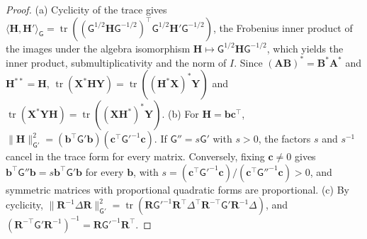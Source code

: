 \begin{proof}
(a) Cyclicity of the trace gives $\langle\mathbf H,\mathbf H'\rangle_{\mathsf G}=\operatorname{tr}((\mathsf G^{1/2}\mathbf H\mathsf G^{-1/2})^\top\mathsf G^{1/2}\mathbf H'\mathsf G^{-1/2})$, the Frobenius inner product of the images under the algebra isomorphism $\mathbf H\mapsto\mathsf G^{1/2}\mathbf H\mathsf G^{-1/2}$, which yields the inner product, submultiplicativity and the norm of $I$. Since $(\mathbf A\mathbf B)^*=\mathbf B^*\mathbf A^*$ and $\mathbf H^{**}=\mathbf H$, $\operatorname{tr}(\mathbf X^*\mathbf H\mathbf Y)=\operatorname{tr}((\mathbf H^*\mathbf X)^*\mathbf Y)$ and $\operatorname{tr}(\mathbf X^*\mathbf Y\mathbf H)=\operatorname{tr}((\mathbf X\mathbf H^*)^*\mathbf Y)$.
(b) For $\mathbf H=\mathbf b\mathbf c^\top$, $\|\mathbf H\|^2_{\mathsf G'}=(\mathbf b^\top\mathsf G'\mathbf b)(\mathbf c^\top\mathsf G'^{-1}\mathbf c)$. If $\mathsf G''=s\mathsf G'$ with $s>0$, the factors $s$ and $s^{-1}$ cancel in the trace form for every matrix. Conversely, fixing $\mathbf c\neq0$ gives $\mathbf b^\top\mathsf G''\mathbf b=s\mathbf b^\top\mathsf G'\mathbf b$ for every $\mathbf b$, with $s=(\mathbf c^\top\mathsf G'^{-1}\mathbf c)/(\mathbf c^\top\mathsf G''^{-1}\mathbf c)>0$, and symmetric matrices with proportional quadratic forms are proportional.
(c) By cyclicity, $\|\mathbf R^{-1}\Delta\mathbf R\|^2_{\mathsf G'}=\operatorname{tr}(\mathbf R\mathsf G'^{-1}\mathbf R^\top\Delta^\top\mathbf R^{-\top}\mathsf G'\mathbf R^{-1}\Delta)$, and $(\mathbf R^{-\top}\mathsf G'\mathbf R^{-1})^{-1}=\mathbf R\mathsf G'^{-1}\mathbf R^\top$.
\end{proof}


